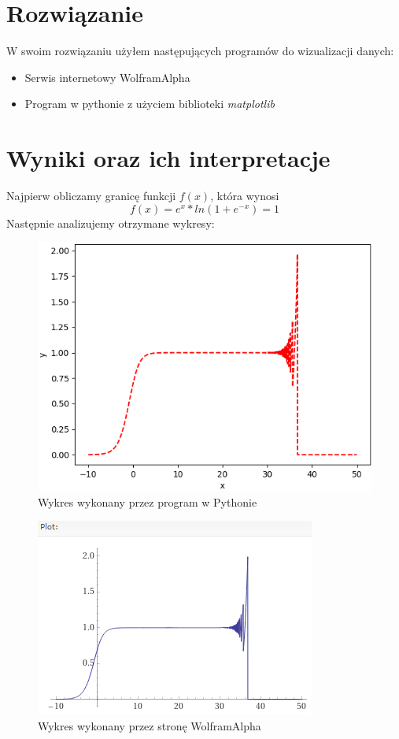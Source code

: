 \documentclass[a4paper,14pt]{report}
\begin{document}
  \section{Rozwiązanie}
    W swoim rozwiązaniu użyłem następujących programów do wizualizacji danych:
    \begin{itemize}
      \item Serwis internetowy WolframAlpha
      \item Program w pythonie z użyciem biblioteki \textit{matplotlib}
    \end{itemize}
  \section{Wyniki oraz ich interpretacje}
    Najpierw obliczamy granicę funkcji $f(x)$, która wynosi
    \begin{equation}
      f(x)=e^{x}*ln(1+e^{-x})=1
    \end{equation}
    Następnie analizujemy otrzymane wykresy: \\
    \begin{figure}[H]
      \includegraphics[scale=0.8]{wykresPython}
      \centering
      \caption{Wykres wykonany przez program w Pythonie}
    \end{figure}
    \begin{figure}[H]
      \includegraphics[scale=1.5]{wykresWolfram}
      \centering
      \caption{Wykres wykonany przez stronę WolframAlpha}
    \end{figure}
\end{document}
